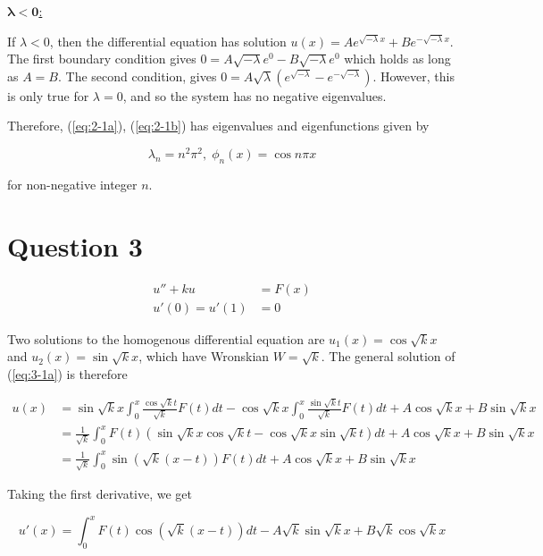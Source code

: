 \documentclass{article}
\begin{document}
\hfill\break
\underline{$\bm{\lambda < 0}$:}

If $\lambda < 0$, then the differential equation has solution
$u(x) = Ae^{\sqrt{-\lambda} x} + Be^{-\sqrt{-\lambda} x}$. The first boundary
condition gives $0 = A\sqrt{-\lambda}e^0 - B\sqrt{-\lambda}e^0$ which holds as
long as $A = B$. The second condition, gives
$0 = A\sqrt{\lambda}(e^{\sqrt{-\lambda}} - e^{-\sqrt{-\lambda}})$. However,
this is only true for $\lambda = 0$, and so the system has no negative
eigenvalues.

\hfill \break
Therefore, (\ref{eq:2-1a}), (\ref{eq:2-1b}) has eigenvalues and eigenfunctions
given by

\begin{equation*}
    \lambda_n = n^2\pi^2,\; \phi_n(x) = \cos n\pi x
\end{equation*}

for non-negative integer $n$.

\section*{Question 3}

\begin{align}
    u'' + ku &= F(x) \label{eq:3-1a}\\
    u'(0) = u'(1) &= 0 \label{eq:3-1b}
\end{align}

Two solutions to the homogenous differential equation are
$u_1(x) = \cos\sqrt k x$ and $u_2(x) = \sin\sqrt k x$, which have Wronskian
$W = \sqrt k$. The general solution of (\ref{eq:3-1a}) is therefore

\begin{align}
    u(x) &= \sin\sqrt k x \int_0^x \frac{\cos\sqrt k t}{\sqrt k} F(t) dt
        -\cos\sqrt k x \int_0^x \frac{\sin\sqrt k t}{\sqrt k} F(t)dt
        + A\cos\sqrt k x + B\sin\sqrt k x \nonumber\\
    &= \frac{1}{\sqrt k}\int_0^x F(t)(\sin\sqrt k x\cos\sqrt k t
        - \cos\sqrt k x \sin\sqrt k t) dt + A\cos\sqrt k x
        + B\sin\sqrt k x \nonumber\\
    &= \frac{1}{\sqrt{k}} \int_0^x \sin(\sqrt k(x - t))F(t) dt
        + A\cos\sqrt k x + B\sin\sqrt k x \label{eq:3-2}
\end{align}

Taking the first derivative, we get

\begin{equation} \label{eq:3-3}
    u'(x) = \int_0^x F(t)\cos(\sqrt k(x - t)) dt
        - A\sqrt k\sin\sqrt k x + B\sqrt k\cos\sqrt k x
\end{equation}
\end{document}
